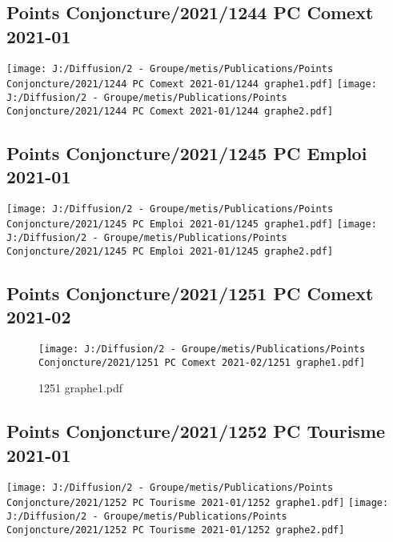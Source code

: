 \documentclass[
]{article}
\begin{document}
\hypertarget{points-conjoncture20211244-pc-comext-2021-01}{%
\subsection{Points Conjoncture/2021/1244 PC Comext
2021-01}\label{points-conjoncture20211244-pc-comext-2021-01}}

\texttt{[image: J:/Diffusion/2 - Groupe/metis/Publications/Points Conjoncture/2021/1244 PC Comext 2021-01/1244 graphe1.pdf]}
\texttt{[image: J:/Diffusion/2 - Groupe/metis/Publications/Points Conjoncture/2021/1244 PC Comext 2021-01/1244 graphe2.pdf]}

\hypertarget{points-conjoncture20211245-pc-emploi-2021-01}{%
\subsection{Points Conjoncture/2021/1245 PC Emploi
2021-01}\label{points-conjoncture20211245-pc-emploi-2021-01}}

\texttt{[image: J:/Diffusion/2 - Groupe/metis/Publications/Points Conjoncture/2021/1245 PC Emploi 2021-01/1245 graphe1.pdf]}
\texttt{[image: J:/Diffusion/2 - Groupe/metis/Publications/Points Conjoncture/2021/1245 PC Emploi 2021-01/1245 graphe2.pdf]}

\hypertarget{points-conjoncture20211251-pc-comext-2021-02}{%
\subsection{Points Conjoncture/2021/1251 PC Comext
2021-02}\label{points-conjoncture20211251-pc-comext-2021-02}}

\begin{figure}
\centering
\texttt{[image: J:/Diffusion/2 - Groupe/metis/Publications/Points Conjoncture/2021/1251 PC Comext 2021-02/1251 graphe1.pdf]}
\caption{1251 graphe1.pdf}
\end{figure}

\hypertarget{points-conjoncture20211252-pc-tourisme-2021-01}{%
\subsection{Points Conjoncture/2021/1252 PC Tourisme
2021-01}\label{points-conjoncture20211252-pc-tourisme-2021-01}}

\texttt{[image: J:/Diffusion/2 - Groupe/metis/Publications/Points Conjoncture/2021/1252 PC Tourisme 2021-01/1252 graphe1.pdf]}
\texttt{[image: J:/Diffusion/2 - Groupe/metis/Publications/Points Conjoncture/2021/1252 PC Tourisme 2021-01/1252 graphe2.pdf]}
\end{document}
